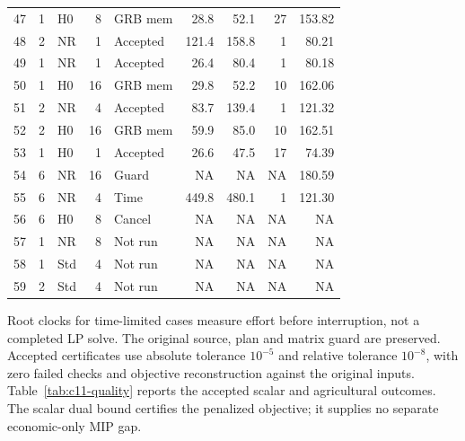\documentclass[
  english,
  11pt,
  a4paper,
]{article}
\begin{document}
\begin{longtable}{@{}rrlrlrrrr@{}}
47 & 1 & H0 & 8 & GRB mem & 28.8 & 52.1 & 27 & 153.82\\
48 & 2 & NR & 1 & Accepted & 121.4 & 158.8 & 1 & 80.21\\
49 & 1 & NR & 1 & Accepted & 26.4 & 80.4 & 1 & 80.18\\
50 & 1 & H0 & 16 & GRB mem & 29.8 & 52.2 & 10 & 162.06\\
51 & 2 & NR & 4 & Accepted & 83.7 & 139.4 & 1 & 121.32\\
52 & 2 & H0 & 16 & GRB mem & 59.9 & 85.0 & 10 & 162.51\\
53 & 1 & H0 & 1 & Accepted & 26.6 & 47.5 & 17 & 74.39\\
54 & 6 & NR & 16 & Guard & NA & NA & NA & 180.59\\
55 & 6 & NR & 4 & Time & 449.8 & 480.1 & 1 & 121.30\\
56 & 6 & H0 & 8 & Cancel & NA & NA & NA & NA\\
57 & 1 & NR & 8 & Not run & NA & NA & NA & NA\\
58 & 1 & Std & 4 & Not run & NA & NA & NA & NA\\
59 & 2 & Std & 4 & Not run & NA & NA & NA & NA\\
\bottomrule\end{longtable}\endgroup

Root clocks for time-limited cases measure effort before interruption, not a completed LP solve. The original source, plan and matrix guard are preserved. Accepted certificates use absolute tolerance $10^{-5}$ and relative tolerance $10^{-8}$, with zero failed checks and objective reconstruction against the original inputs. Table~\ref{tab:c11-quality} reports the accepted scalar and agricultural outcomes. The scalar dual bound certifies the penalized objective; it supplies no separate economic-only MIP gap.
\end{document}
